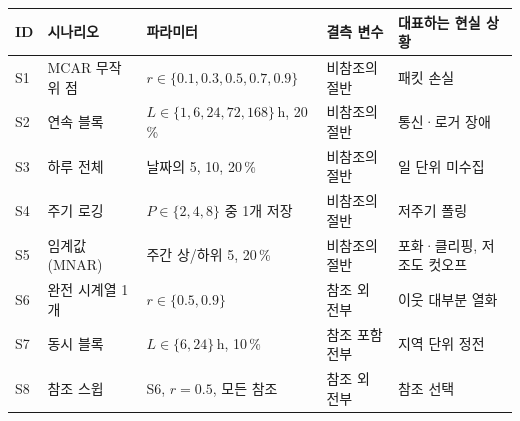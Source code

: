 \begin{tabular}{lllll}
\toprule
ID & 시나리오 & 파라미터 & 결측 변수 & 대표하는 현실 상황 \\
\midrule
S1 & MCAR 무작위 점 & $r \in \{0.1,0.3,0.5,0.7,0.9\}$ & 비참조의 절반 & 패킷 손실 \\
S2 & 연속 블록 & $L \in \{1,6,24,72,168\}$\,h, 20\,\% & 비참조의 절반 & 통신·로거 장애 \\
S3 & 하루 전체 & 날짜의 5, 10, 20\,\% & 비참조의 절반 & 일 단위 미수집 \\
S4 & 주기 로깅 & $P \in \{2,4,8\}$ 중 1개 저장 & 비참조의 절반 & 저주기 폴링 \\
S5 & 임계값 (MNAR) & 주간 상/하위 5, 20\,\% & 비참조의 절반 & 포화·클리핑, 저조도 컷오프 \\
S6 & 완전 시계열 1개 & $r \in \{0.5,0.9\}$ & 참조 외 전부 & 이웃 대부분 열화 \\
S7 & 동시 블록 & $L \in \{6,24\}$\,h, 10\,\% & 참조 포함 전부 & 지역 단위 정전 \\
S8 & 참조 스윕 & S6, $r{=}0.5$, 모든 참조 & 참조 외 전부 & 참조 선택 \\
\bottomrule
\end{tabular}
